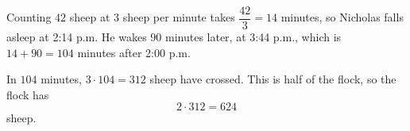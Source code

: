 Counting $42$ sheep at $3$ sheep per minute takes $\dfrac{42}{3}=14$ minutes, so Nicholas falls asleep at 2:14 p.m. He wakes $90$ minutes later, at 3:44 p.m., which is $14+90=104$ minutes after 2:00 p.m.

In $104$ minutes, $3\cdot104=312$ sheep have crossed. This is half of the flock, so the flock has
\[2\cdot312=\boxed{624}\]
sheep.
